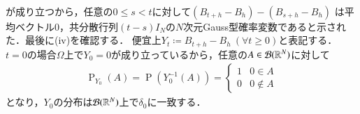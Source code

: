 \begin{prf}
\begin{description}
\begin{align}
		\end{align}
		が成り立つから，任意の$0 \leq s < t$に対して$(B_{t+h} - B_h) - (B_{s+h} - B_h) $
		は平均ベクトル0，共分散行列$(t-s)I_N$の$N$次元Gauss型確率変数であると示された．最後に(iv)を確認する．
		便宜上$Y_t \coloneqq B_{t+h} - B_h\ (\forall t \geq 0)$と表記する．
		$t=0$の場合$\Omega$上で$Y_0 = 0$が成り立っているから，任意の$A \in \mathcal{B}(\mathbb{R}^N)$に対して
		\begin{align}
			\operatorname{P}_{Y_0}(A) 
			= \operatorname{P}\left(Y_0^{-1}(A)\right) 
			= \begin{cases}
				1 & 0 \in A \\
				0 & 0 \notin A
			\end{cases}
		\end{align}
		となり，$Y_0$の分布は$\mathcal{B}(\mathbb{R}^N)$上で$\delta_0$に一致する．
		\QED
\end{description}
\end{prf}
